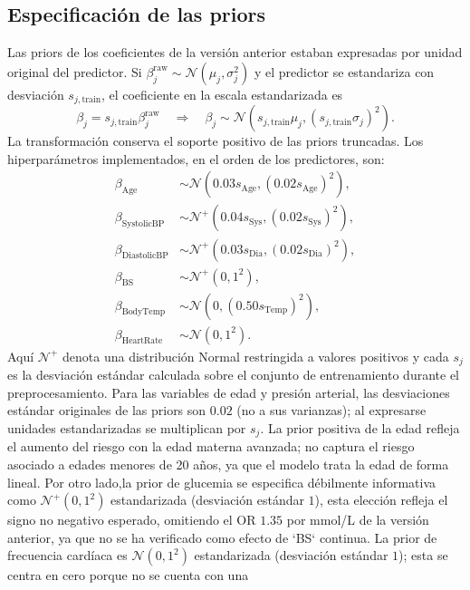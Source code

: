\subsection{Especificación de las priors}
Las priors de los coeficientes de la versión anterior estaban expresadas por
unidad original del predictor. Si
$\beta_j^{\mathrm{raw}}\sim\mathcal{N}(\mu_j,\sigma_j^2)$ y el predictor se
estandariza con desviación $s_{j,\mathrm{train}}$, el coeficiente en la escala
estandarizada es
\[
\beta_j=s_{j,\mathrm{train}}\beta_j^{\mathrm{raw}}
\quad\Longrightarrow\quad
\beta_j\sim
\mathcal{N}\!\left(s_{j,\mathrm{train}}\mu_j,
                  (s_{j,\mathrm{train}}\sigma_j)^2\right).
\]
La transformación conserva el soporte positivo de las priors truncadas. Los
hiperparámetros implementados, en el orden de los predictores, son:
\[
\begin{aligned}
\beta_{\mathrm{Age}} &\sim
 \mathcal{N}(0.03s_{\mathrm{Age}},(0.02s_{\mathrm{Age}})^2),\\
\beta_{\mathrm{SystolicBP}} &\sim
 \mathcal{N}^{+}(0.04s_{\mathrm{Sys}},(0.02s_{\mathrm{Sys}})^2),\\
\beta_{\mathrm{DiastolicBP}} &\sim
 \mathcal{N}^{+}(0.03s_{\mathrm{Dia}},(0.02s_{\mathrm{Dia}})^2),\\
\beta_{\mathrm{BS}} &\sim
 \mathcal{N}^{+}(0,1^2),\\
\beta_{\mathrm{BodyTemp}} &\sim
 \mathcal{N}(0,(0.50s_{\mathrm{Temp}})^2),\\
\beta_{\mathrm{HeartRate}} &\sim
 \mathcal{N}(0,1^2).
\end{aligned}
\]
Aquí $\mathcal{N}^{+}$ denota una distribución Normal restringida a valores positivos y cada
$s_j$ es la desviación estándar calculada sobre el conjunto de entrenamiento durante el preprocesamiento.
Para las variables de edad y presión arterial, las desviaciones estándar originales de las
priors son $0.02$ (no a sus varianzas); al expresarse unidades estandarizadas se multiplican
por $s_j$. La prior positiva de la edad refleja el aumento del riesgo con la edad materna
avanzada; no captura el riesgo asociado a edades menores de 20 años, ya que el
modelo trata la edad de forma lineal. Por otro lado,la prior de glucemia se especifica débilmente informativa como
$\mathcal{N}^{+}(0,1^2)$ estandarizada (desviación estándar $1$), esta elección refleja el
signo no negativo esperado, omitiendo el OR $1.35$ por mmol/L de la versión anterior, ya que no se ha
verificado como efecto de `BS` continua. La prior de frecuencia cardíaca es
$\mathcal{N}(0,1^2)$ estandarizada (desviación estándar $1$); esta se centra en cero porque no se cuenta con una
